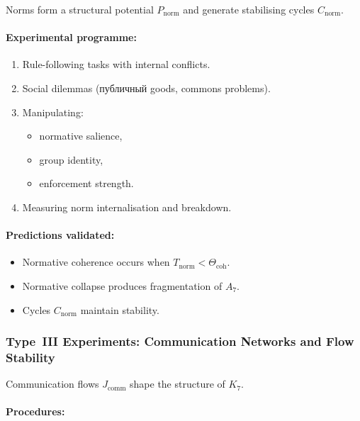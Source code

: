 Norms form a structural potential $P_{\mathrm{norm}}$ and 
generate stabilising cycles $C_{\mathrm{norm}}$.

\paragraph{Experimental programme:}

\begin{enumerate}
    \item Rule-following tasks with internal conflicts.
    \item Social dilemmas (публичный goods, commons problems).
    \item Manipulating:
          \begin{itemize}
              \item normative salience,
              \item group identity,
              \item enforcement strength.
          \end{itemize}
    \item Measuring norm internalisation and breakdown.
\end{enumerate}

\paragraph{Predictions validated:}

\begin{itemize}
    \item Normative coherence occurs when 
          $T_{\mathrm{norm}} < \Theta_{\mathrm{coh}}$.
    \item Normative collapse produces fragmentation of $A_7$.
    \item Cycles $C_{\mathrm{norm}}$ maintain stability.
\end{itemize}



\subsubsection{Type~III Experiments: Communication Networks and Flow Stability}

Communication flows $J_{\mathrm{comm}}$ shape the structure of $K_7$.

\paragraph{Procedures:}

